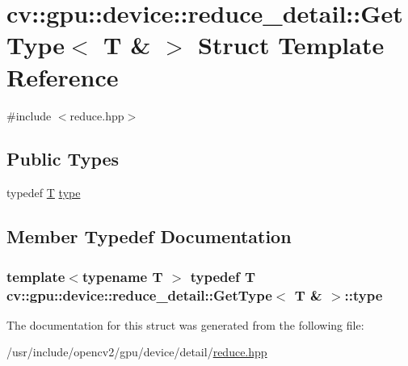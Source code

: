 \hypertarget{structcv_1_1gpu_1_1device_1_1reduce__detail_1_1GetType_3_01T_01_6_01_4}{\section{cv\-:\-:gpu\-:\-:device\-:\-:reduce\-\_\-detail\-:\-:Get\-Type$<$ T \& $>$ Struct Template Reference}
\label{structcv_1_1gpu_1_1device_1_1reduce__detail_1_1GetType_3_01T_01_6_01_4}
}


{\ttfamily \#include $<$reduce.\-hpp$>$}

\subsection*{Public Types}
\begin{DoxyCompactItemize}
\item 
typedef \hyperlink{calib3d_8hpp_a3efb9551a871ddd0463079a808916717}{T} \hyperlink{structcv_1_1gpu_1_1device_1_1reduce__detail_1_1GetType_3_01T_01_6_01_4_a8157b64643430a8c3b6aa680100754e5}{type}
\end{DoxyCompactItemize}


\subsection{Member Typedef Documentation}
\hypertarget{structcv_1_1gpu_1_1device_1_1reduce__detail_1_1GetType_3_01T_01_6_01_4_a8157b64643430a8c3b6aa680100754e5}{
\subsubsection[{type}]{\setlength{\rightskip}{0pt plus 5cm}template$<$typename T $>$ typedef {\bf T} {\bf cv\-::gpu\-::device\-::reduce\-\_\-detail\-::\-Get\-Type}$<$ {\bf T} \& $>$\-::{\bf type}}}\label{structcv_1_1gpu_1_1device_1_1reduce__detail_1_1GetType_3_01T_01_6_01_4_a8157b64643430a8c3b6aa680100754e5}


The documentation for this struct was generated from the following file\-:\begin{DoxyCompactItemize}
\item 
/usr/include/opencv2/gpu/device/detail/\hyperlink{detail_2reduce_8hpp}{reduce.\-hpp}\end{DoxyCompactItemize}
